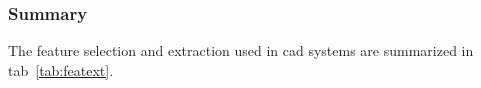 

\subsubsection{Summary}

The feature selection and extraction used in \ac{cad} systems are summarized in \acs{tab}~\ref{tab:featext}.

